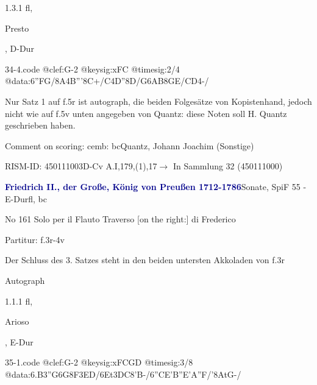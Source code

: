 \documentclass[a4paper, twocolumn, 11pt]{book}
\begin{document}
\newline %
\par 1.3.1  fl, \begin{itshape}Presto\end{itshape}, D-Dur  
\begin{filecontents*}{34-4.code}
@clef:G-2
@keysig:xFC
@timesig:2/4
@data:6''{FG}/8A4B'''8C+/C4D''8D/{G6AB}{8GE}/{CD}4-/
\end{filecontents*}

\newline %
\par Nur Satz 1 auf f.5r ist autograph, die beiden Folgesätze von Kopistenhand, jedoch nicht wie auf f.5v unten angegeben von Quantz: {\textquotedbl}diese Noten soll H. Quantz geschrieben haben.{\textquotedbl}
\par Comment on scoring: cemb: bc\newline Quantz, Johann Joachim  (Sonstige)
\par RISM-ID: 450111003\newline D-Cv  A.I,179,(1),17\newline $\rightarrow$ In Sammlung 32 (450111000)
      
\par \vspace{16pt} \textcolor{darkblue}{\textbf{Friedrich II., der Große, König von Preußen  1712-1786}}\hfillplus{[35]}\newline Sonate, SpiF 55 - E-Dur\newline fl, bc
\par \begin{itshape} No 161 Solo per il Flauto Traverso [on the right:] di Frederico\end{itshape} 
\par \textcolor{darkblue}{}  Partitur: f.3r-4v\newline \begin{small} Der Schluss des 3. Satzes steht in den beiden untersten Akkoladen von f.3r\end{small} \newline Autograph
\par 1.1.1  fl, \begin{itshape}Arioso\end{itshape}, E-Dur  
\begin{filecontents*}{35-1.code}
@clef:G-2
@keysig:xFCGD
@timesig:3/8
@data:{6.B3''G}{6G8F3ED}/{6Et3DC}8'B-/{6''CE'B''E'A''F}/'8{AtG}-/
\end{filecontents*}
\end{document}
